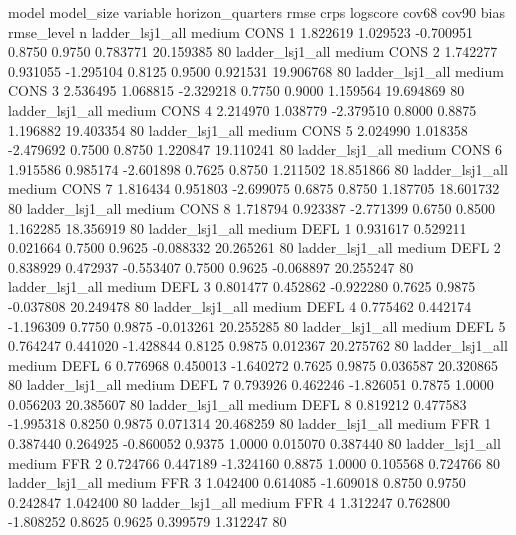                  model model_size variable  horizon_quarters      rmse     crps  logscore  cov68  cov90      bias  rmse_level  n
       ladder_lsj1_all     medium     CONS                 1  1.822619 1.029523 -0.700951 0.8750 0.9750  0.783771   20.159385 80
       ladder_lsj1_all     medium     CONS                 2  1.742277 0.931055 -1.295104 0.8125 0.9500  0.921531   19.906768 80
       ladder_lsj1_all     medium     CONS                 3  2.536495 1.068815 -2.329218 0.7750 0.9000  1.159564   19.694869 80
       ladder_lsj1_all     medium     CONS                 4  2.214970 1.038779 -2.379510 0.8000 0.8875  1.196882   19.403354 80
       ladder_lsj1_all     medium     CONS                 5  2.024990 1.018358 -2.479692 0.7500 0.8750  1.220847   19.110241 80
       ladder_lsj1_all     medium     CONS                 6  1.915586 0.985174 -2.601898 0.7625 0.8750  1.211502   18.851866 80
       ladder_lsj1_all     medium     CONS                 7  1.816434 0.951803 -2.699075 0.6875 0.8750  1.187705   18.601732 80
       ladder_lsj1_all     medium     CONS                 8  1.718794 0.923387 -2.771399 0.6750 0.8500  1.162285   18.356919 80
       ladder_lsj1_all     medium     DEFL                 1  0.931617 0.529211  0.021664 0.7500 0.9625 -0.088332   20.265261 80
       ladder_lsj1_all     medium     DEFL                 2  0.838929 0.472937 -0.553407 0.7500 0.9625 -0.068897   20.255247 80
       ladder_lsj1_all     medium     DEFL                 3  0.801477 0.452862 -0.922280 0.7625 0.9875 -0.037808   20.249478 80
       ladder_lsj1_all     medium     DEFL                 4  0.775462 0.442174 -1.196309 0.7750 0.9875 -0.013261   20.255285 80
       ladder_lsj1_all     medium     DEFL                 5  0.764247 0.441020 -1.428844 0.8125 0.9875  0.012367   20.275762 80
       ladder_lsj1_all     medium     DEFL                 6  0.776968 0.450013 -1.640272 0.7625 0.9875  0.036587   20.320865 80
       ladder_lsj1_all     medium     DEFL                 7  0.793926 0.462246 -1.826051 0.7875 1.0000  0.056203   20.385607 80
       ladder_lsj1_all     medium     DEFL                 8  0.819212 0.477583 -1.995318 0.8250 0.9875  0.071314   20.468259 80
       ladder_lsj1_all     medium      FFR                 1  0.387440 0.264925 -0.860052 0.9375 1.0000  0.015070    0.387440 80
       ladder_lsj1_all     medium      FFR                 2  0.724766 0.447189 -1.324160 0.8875 1.0000  0.105568    0.724766 80
       ladder_lsj1_all     medium      FFR                 3  1.042400 0.614085 -1.609018 0.8750 0.9750  0.242847    1.042400 80
       ladder_lsj1_all     medium      FFR                 4  1.312247 0.762800 -1.808252 0.8625 0.9625  0.399579    1.312247 80
